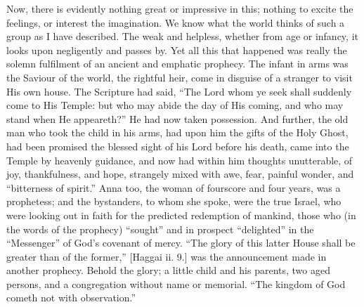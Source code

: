 Now, there is evidently nothing great or impressive in this; nothing
to excite the feelings, or interest the imagination. We know what the
world thinks of such a group as I have described. The weak and helpless,
whether from age or infancy, it looks upon negligently and passes by.
Yet all this that happened was really the solemn fulfilment of an
ancient and emphatic prophecy. The infant in arms was the Saviour of the
world, the rightful heir, come in disguise of a stranger to visit His
own house. The Scripture had said, ``The Lord whom ye seek shall
suddenly come to His Temple: but who may abide the day of His coming,
and who may stand when He appeareth?'' He had now taken possession.
And further, the old man who took the child in his arms, had upon him
the gifts of the Holy Ghost, had been promised the blessed sight of his
Lord before his death, came into the Temple by heavenly guidance, and
now had within him thoughts unutterable, of joy, thankfulness, and hope,
strangely mixed with awe, fear, painful wonder, and ``bitterness of
spirit.'' Anna too, the woman of fourscore and four years, was a
prophetess; and the bystanders, to whom she spoke, were the true Israel,
who were looking out in faith for the predicted redemption of mankind,
those who (in the words of the prophecy) ``sought'' and in
prospect ``delighted'' in the ``Messenger'' of God's
covenant of mercy. ``The glory of this latter House shall be greater
than of the former,'' [Haggai ii. 9.] was the announcement made in
another prophecy. Behold the glory; a little child and his parents, two
aged persons, and a congregation without name or memorial. ``The
kingdom of God cometh not with observation.''

